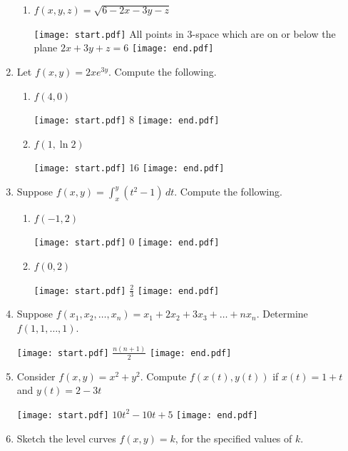 \documentclass[12pt]{article}
\begin{document}
\begin{enumerate}
\begin{enumerate}
\item $f(x,y,z)=\sqrt{6-2x-3y-z}$

\texttt{[image: start.pdf]}
{{All points in 3-space which are on or below the plane $2x+3y+z=6$}}
\texttt{[image: end.pdf]}


\end{enumerate}

\item Let $f(x,y)=2xe^{3y}$.  Compute the following.

\begin{enumerate}

\item $f(4,0)$

\texttt{[image: start.pdf]}
{{8}}
\texttt{[image: end.pdf]}


\item $f(1,\ln2)$

\texttt{[image: start.pdf]}
{{16}}
\texttt{[image: end.pdf]}


\end{enumerate}

\item Suppose $f(x,y)=\int_x^y (t^2-1) \,dt$.  Compute the following.

\begin{enumerate}

\item $f(-1,2)$

\texttt{[image: start.pdf]}
{{0}}
\texttt{[image: end.pdf]}


\item $f(0,2)$

\texttt{[image: start.pdf]}
{{$\frac{2}{3}$}}
\texttt{[image: end.pdf]}


\end{enumerate}

\item Suppose $f(x_1,x_2,\dots,x_n)=x_1+2x_2+3x_3+\dots+nx_n$.  Determine $f(1,1,\dots,1)$.

\texttt{[image: start.pdf]}
{{$\frac{n(n+1)}{2}$}}
\texttt{[image: end.pdf]}


\item Consider $f(x,y)=x^2+y^2$.  Compute $f(x(t),y(t))$ if $x(t)=1+t$ and $y(t)=2-3t$

\texttt{[image: start.pdf]}
{{$10t^2-10t+5$}}
\texttt{[image: end.pdf]}


\newpage

\item Sketch the level curves $f(x,y)=k$, for the specified values of $k$.


\end{enumerate}
\end{document}
